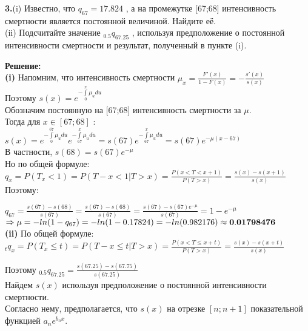 \documentclass{article}
\begin{document}
{\bf \large 3.}(i) Известно, что $q_{67}= 17.824$ \textperthousand , а на промежутке [67;68] интенсивность смертности является постоянной величиной. Найдите её. \\
(ii) Подсчитайте значение $_{0.5}q_{67.25 }$ , используя предположение о постоянной интенсивности смертности и результат, полученный в пункте (i). 

{\bf \large Решение:}\\

{\bf \large  (i)}  Напомним, что интенсивность смертности $\mu_x = \frac {F'(x)} {1-F(x)} = -\frac {s'(x)} {s(x)} $\\

Поэтому $s(x) = e^{-\int\limits_{0}^{x} \mu_u du}$\\

Обозначим постоянную на  [67;68] интенсивность смертности за $\mu.$\\

Тогда для $x \in [67;68] $ : \\
 $s(x) =  e^{-\int\limits_{0}^{67} \mu_u du}  e^{-\int\limits_{67}^{x} \mu_u du} = s(67) e^{-\int\limits_{67}^{x} \mu_u du} = s(67)e^{-\mu(x-67)}$\\
 
 В частности,  $s(68) = s(67)e^{-\mu}$\\
 
 Но по общей формуле:\\
  $q_x = P(T_x < 1) = P(T-x < 1 | T>x) = \frac {P(x < T<x+1)}{ P(T>x)} = \frac{ s(x) - s(x+1)}{ s(x)}$\\
  
  Поэтому:
  
 $q_{67} = \frac{ s(67) - s(68)}{ s(67)} = \frac{ s(67) - s(68)}{ s(67)}  = \frac{ s(67) - s(67)e^{-\mu} }{ s(67)} = 1-e^{-\mu}$\\
 
 $\Rightarrow \mu = -ln(1-q_{67}) = -ln(1-0.17824) = -ln(0.982176) \approx \bf  0.01798476$\\
 
 
 {\bf \large  (ii)} По общей формуле:\\
$ _{t}q_x = P(T_x \leq t) = P(T-x \leq t | T>x ) = \frac { P(x < T \leq x+t) } { P(T > x) }  = \frac { s(x) - s(x+t)} { s(x)} $

Поэтому $ _{0.5}q_{67.25 } =   \frac { s(67.25) - s(67.75)} { s(67.25)} $\\

Найдем $ s(x)$  используя предположение о постоянной интенсивности смертности.\\
Согласно нему, предполагается, что  $s(x)$ на отрезке $  [n; n+1]$  показательной функцией $ a_n e^{b_nx}$.\\
\end{document}
